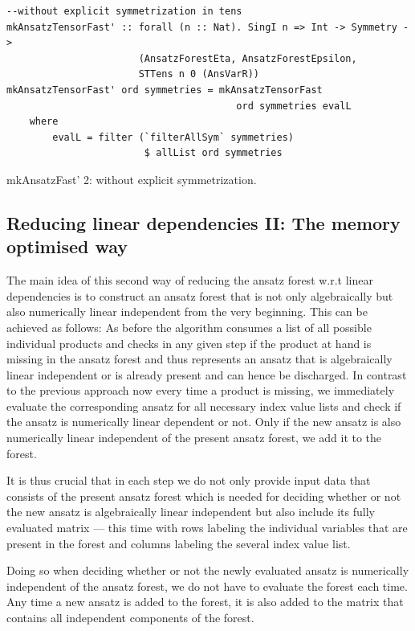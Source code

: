\documentclass[a4paper,12pt, DIV=14, BCOR=5mm, twoside, headsepline, numbers=noenddot]{scrbook}
\begin{document}
\begin{listing}[hbt!]
\begin{verbatim}
--without explicit symmetrization in tens
mkAnsatzTensorFast' :: forall (n :: Nat). SingI n => Int -> Symmetry ->
                       (AnsatzForestEta, AnsatzForestEpsilon,
                       STTens n 0 (AnsVarR))
mkAnsatzTensorFast' ord symmetries = mkAnsatzTensorFast
                                        ord symmetries evalL
    where
        evalL = filter (`filterAllSym` symmetries) 
                        $ allList ord symmetries
\end{verbatim} 
\caption{mkAnsatzFast' 2: without explicit symmetrization.}\label{mkAnsatzFast'2}
\end{listing}

\subsection*{Reducing linear dependencies II:  The memory optimised way}

The main idea of this second way of reducing the ansatz forest w.r.t linear dependencies is to construct an ansatz forest that is not only algebraically but also numerically linear independent from the very beginning. This can be achieved as follows: As before the algorithm consumes a list of all possible individual products and checks in any given step if the product at hand is missing in the ansatz forest and thus represents an ansatz that is algebraically linear independent or is already present and can hence be discharged. In contrast to the previous approach now every time a product is missing, we immediately evaluate the corresponding ansatz for all necessary index value lists and check if the ansatz is numerically linear dependent or not. Only if the new ansatz is also numerically linear independent of the present ansatz forest, we add it to the forest.

It is thus crucial that in each step we do not only provide input data that consists of the present ansatz forest which is needed for deciding whether or not the new ansatz is algebraically linear independent but also include its fully evaluated matrix --- this time with rows labeling the individual variables that are present in the forest and columns labeling the several index value list.

 Doing so when deciding whether or not the newly evaluated ansatz is numerically independent of the ansatz forest, we do not have to evaluate the forest each time. Any time a  new ansatz is added to the forest, it is also added to the matrix that contains all independent components of the forest.
\end{document}
